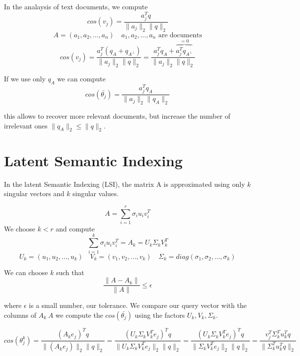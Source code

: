 In the analaysis of text documents, we compute
$$ cos(v_j) = \frac{a_j^Tq}{\|a_j\|_2 \|q\|_2} $$
$$ A = (a_1, a_2, \ldots, a_n) \quad a_1, a_2, \ldots, a_n \text{ are documents} $$
$$ cos(v_j) = \frac{a_j^T(q_A + q_{A^{\perp}})}{\|a_j\|_2 \|q\|_2} = 
\frac{a_j^Tq_A + \overbrace{a_j^Tq_{A^{\perp}}}^{=0}}{\|a_j\|_2 \|q\|_2}
$$

If we use only $q_A$ we can compute
$$ cos(\bar{\theta_j}) = \frac{a_j^Tq_A}{\|a_j\|_2 \|q_A\|_2}$$

this allows to recover more relevant documents, but increase the number of irrelevant ones $ \|q_A\|_2 \leq \|q\|_2$.

\section{Latent Semantic Indexing}
In the latent Semantic Indexing (LSI), the matrix A is approximated using only $k$ singular vectors and
$k$ singular values.

$$ A = \sum_{i=1}^r \sigma_i u_i v_i^T $$
We choose $k < r$ and compute
$$\sum_{i=1}^k \sigma_i u_i v_i^T = A_k = U_k\Sigma_kV_k^T$$
$$U_k = (u_1, u_2, \ldots, u_k) \quad V_k = (v_1, v_2, \ldots, v_k) \quad \Sigma_k = diag(\sigma_1, \sigma_2, \ldots, \sigma_k)$$

We can choose $k$ such that
$$ \frac{\|A - A_k\|}{\|A\|} \leq \epsilon $$

where $\epsilon$ is a small number, our tolerance.
We compare our query vector with the columns of $A_k ~ A$ we compute the $cos(\bar{\theta_j})$ using the factors $U_k, V_k, \Sigma_k$.

$$
cos(\theta^k_j) = \frac{(A_ke_j)^Tq}{\|(A_ke_j)\|_2 \|q\|_2}
= \frac{(U_k\Sigma_k V_k^T e_j)^Tq}{\|U_k\Sigma_k V_k^T e_j\|_2 \|q\|_2}
= \frac{(U_k\Sigma_k V_k^T e_j)^Tq}{\|\Sigma_k V_k^T e_j\|_2 \|q\|_2}
= \frac{v_j^T\Sigma_k^Tu_k^Tq}{\|\Sigma_k^Tu_k^Tq\|_2}$$